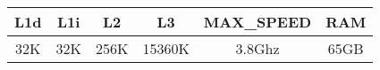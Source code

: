 \begin{tabular}{cccccc} L1d &  L1i &    L2 &      L3 & MAX\_SPEED &   RAM \\
\midrule
 32K &  32K &  256K &  15360K &    3.8Ghz &  65GB \\
\end{tabular}